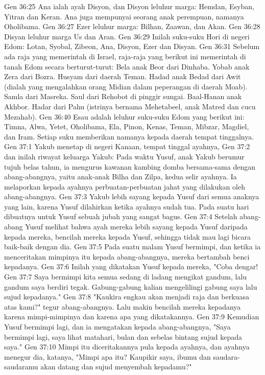 Gen 36:25  Ana ialah ayah Disyon, dan Disyon leluhur marga: Hemdan, Esyban, Yitran dan Keran. Ana juga mempunyai seorang anak perempuan, namanya Oholibama.
Gen 36:27  Ezer leluhur marga: Bilhan, Zaawan, dan Akan.
Gen 36:28  Disyan leluhur marga Us dan Aran.
Gen 36:29  Inilah suku-suku Hori di negeri Edom: Lotan, Syobal, Zibeon, Ana, Disyon, Ezer dan Disyan.
Gen 36:31  Sebelum ada raja yang memerintah di Israel, raja-raja yang berikut ini memerintah di tanah Edom secara berturut-turut: Bela anak Beor dari Dinhaba. Yobab anak Zera dari Bozra. Husyam dari daerah Teman. Hadad anak Bedad dari Awit (dialah yang mengalahkan orang Midian dalam peperangan di daerah Moab). Samla dari Masreka. Saul dari Rehobot di pinggir sungai. Baal-Hanan anak Akhbor. Hadar dari Pahu (istrinya bernama Mehetabeel, anak Matred dan cucu Mezahab).
Gen 36:40  Esau adalah leluhur suku-suku Edom yang berikut ini: Timna, Alwa, Yetet, Oholibama, Ela, Pinon, Kenas, Teman, Mibzar, Magdiel, dan Iram. Setiap suku memberikan namanya kepada daerah tempat tinggalnya.
Gen 37:1  Yakub menetap di negeri Kanaan, tempat tinggal ayahnya,
Gen 37:2  dan inilah riwayat keluarga Yakub: Pada waktu Yusuf, anak Yakub berumur tujuh belas tahun, ia mengurus kawanan kambing domba bersama-sama dengan abang-abangnya, yaitu anak-anak Bilha dan Zilpa, kedua selir ayahnya. Ia melaporkan kepada ayahnya perbuatan-perbuatan jahat yang dilakukan oleh abang-abangnya.
Gen 37:3  Yakub lebih sayang kepada Yusuf dari semua anaknya yang lain, karena Yusuf dilahirkan ketika ayahnya sudah tua. Pada suatu hari dibuatnya untuk Yusuf sebuah jubah yang sangat bagus.
Gen 37:4  Setelah abang-abang Yusuf melihat bahwa ayah mereka lebih sayang kepada Yusuf daripada kepada mereka, bencilah mereka kepada Yusuf, sehingga tidak mau lagi bicara baik-baik dengan dia.
Gen 37:5  Pada suatu malam Yusuf bermimpi, dan ketika ia menceritakan mimpinya itu kepada abang-abangnya, mereka bertambah benci kepadanya.
Gen 37:6  Inilah yang dikatakan Yusuf kepada mereka, "Coba dengar!
Gen 37:7  Saya bermimpi kita semua sedang di ladang mengikat gandum, lalu gandum saya berdiri tegak. Gabung-gabung kalian mengelilingi gabung saya lalu sujud kepadanya."
Gen 37:8  "Kaukira engkau akan menjadi raja dan berkuasa atas kami?" tegur abang-abangnya. Lalu makin bencilah mereka kepadanya karena mimpi-mimpinya dan karena apa yang dikatakannya.
Gen 37:9  Kemudian Yusuf bermimpi lagi, dan ia mengatakan kepada abang-abangnya, "Saya bermimpi lagi, saya lihat matahari, bulan dan sebelas bintang sujud kepada saya."
Gen 37:10  Mimpi itu diceritakannya pula kepada ayahnya, dan ayahnya menegur dia, katanya, "Mimpi apa itu? Kaupikir saya, ibumu dan saudara-saudaramu akan datang dan sujud menyembah kepadamu?"
